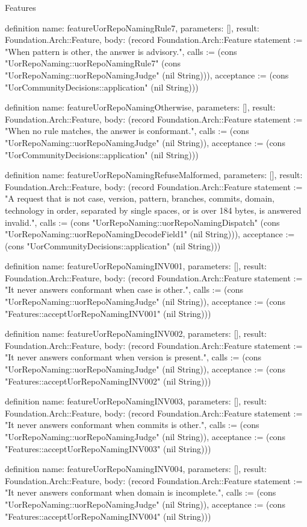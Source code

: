\begin{lexlean}{Features}
\begin{semanticmodule}
definition{
  name: featureUorRepoNamingRule7,
  parameters: [],
  result: Foundation.Arch::Feature,
  body: (record Foundation.Arch::Feature {statement := "When pattern is other, the answer is advisory.", calls := (cons "UorRepoNaming::uorRepoNamingRule7" (cons "UorRepoNaming::uorRepoNamingJudge" (nil String))), acceptance := (cons "UorCommunityDecisions::application" (nil String))})
}

definition{
  name: featureUorRepoNamingOtherwise,
  parameters: [],
  result: Foundation.Arch::Feature,
  body: (record Foundation.Arch::Feature {statement := "When no rule matches, the answer is conformant.", calls := (cons "UorRepoNaming::uorRepoNamingJudge" (nil String)), acceptance := (cons "UorCommunityDecisions::application" (nil String))})
}

definition{
  name: featureUorRepoNamingRefuseMalformed,
  parameters: [],
  result: Foundation.Arch::Feature,
  body: (record Foundation.Arch::Feature {statement := "A request that is not case, version, pattern, branches, commits, domain, technology in order, separated by single spaces, or is over 184 bytes, is answered invalid.", calls := (cons "UorRepoNaming::uorRepoNamingDispatch" (cons "UorRepoNaming::uorRepoNamingDecodeField1" (nil String))), acceptance := (cons "UorCommunityDecisions::application" (nil String))})
}

definition{
  name: featureUorRepoNamingINV001,
  parameters: [],
  result: Foundation.Arch::Feature,
  body: (record Foundation.Arch::Feature {statement := "It never answers conformant when case is other.", calls := (cons "UorRepoNaming::uorRepoNamingJudge" (nil String)), acceptance := (cons "Features::acceptUorRepoNamingINV001" (nil String))})
}

definition{
  name: featureUorRepoNamingINV002,
  parameters: [],
  result: Foundation.Arch::Feature,
  body: (record Foundation.Arch::Feature {statement := "It never answers conformant when version is present.", calls := (cons "UorRepoNaming::uorRepoNamingJudge" (nil String)), acceptance := (cons "Features::acceptUorRepoNamingINV002" (nil String))})
}

definition{
  name: featureUorRepoNamingINV003,
  parameters: [],
  result: Foundation.Arch::Feature,
  body: (record Foundation.Arch::Feature {statement := "It never answers conformant when commits is other.", calls := (cons "UorRepoNaming::uorRepoNamingJudge" (nil String)), acceptance := (cons "Features::acceptUorRepoNamingINV003" (nil String))})
}

definition{
  name: featureUorRepoNamingINV004,
  parameters: [],
  result: Foundation.Arch::Feature,
  body: (record Foundation.Arch::Feature {statement := "It never answers conformant when domain is incomplete.", calls := (cons "UorRepoNaming::uorRepoNamingJudge" (nil String)), acceptance := (cons "Features::acceptUorRepoNamingINV004" (nil String))})
}


\end{semanticmodule}
\end{lexlean}
